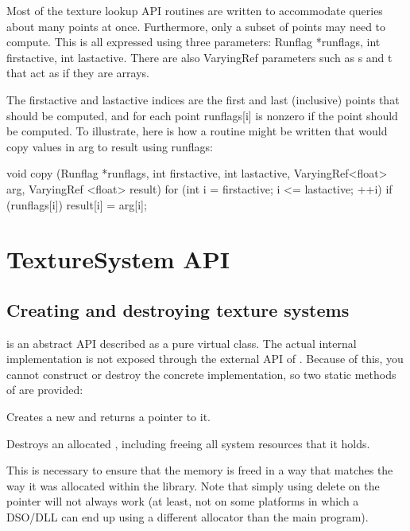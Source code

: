 Most of the texture lookup API routines are written to accommodate
queries about many points at once.  Furthermore, only a subset of
points may need to compute.  This is all expressed using three
parameters:  {\cf Runflag *runflags, int firstactive, int lastactive}.
There are also {\cf VaryingRef} parameters such as {\cf s} and {\cf t}
that act as if they are arrays.

The {\cf firstactive} and {\cf lastactive} indices are the first and
last (inclusive) points that should be computed, and for each point
{\cf runflags[i]} is nonzero if the point should be computed.  To
illustrate, here is how a routine might be written that would copy
values in {\cf arg} to {\cf result} using runflags:

\begin{code}
        void copy (Runflag *runflags, int firstactive, int lastactive,
                   VaryingRef<float> arg, VaryingRef <float> result)
        {
            for (int i = firstactive; i <= lastactive;  ++i)
                if (runflags[i])
                    result[i] = arg[i];
        }
\end{code}


\newpage
\section{TextureSystem API}
\label{sec:texturesys:api}

\subsection{Creating and destroying texture systems}
\label{sec:texturesys:api:createdestroy}

\TextureSystem is an abstract API described as a pure
virtual class.  The actual internal implementation is not exposed
through the external API of \product.  Because of this, you cannot
construct or destroy the concrete implementation, so two static
methods of \TextureSystem are provided:

Creates a new \TextureSystem and returns a pointer to it.
\apiend

Destroys an allocated \TextureSystem, including freeing all system
resources that it holds.

This is necessary to ensure that the memory is freed in a way that
matches the way it was allocated within the library.  Note that simply
using {\cf delete} on the pointer will not always work (at least,
not on some platforms in which a DSO/DLL can end up using a different
allocator than the main program).
\apiend

